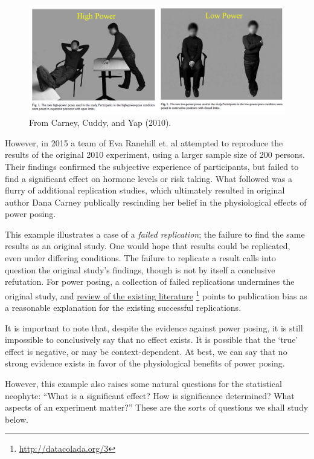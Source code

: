 \documentclass{tufte-handout}
\begin{document}
\begin{figure}[h]
  \includegraphics[width=\linewidth]{./images/2-posing}
  \caption{From Carney, Cuddy, and Yap (2010).}
  \label{fig:2-pose}
\end{figure}

However, in 2015 a team of Eva Ranehill et. al \cite{ranehill2015assessing}
attempted to reproduce the results of the original 2010 experiment, using a
larger sample size of 200 persons. Their findings confirmed the subjective
experience of participants, but failed to find a significant effect on hormone
levels or risk taking. What followed was a flurry of additional replication
studies, which ultimately resulted in original author Dana Carney
\cite{carney2015} publically rescinding her belief in the physiological effects of
power posing.

This example illustrates a case of a \emph{failed replication}; the failure to find
the same results as an original study. One would hope that results could be
replicated, even under differing conditions. The failure to replicate a result
calls into question the original study's findings, though is not by itself a
conclusive refutation. For power posing, a collection of failed replications
undermines the original study, and \href{http://datacolada.org/37}{review of the existing literature}
\footnote{\url{http://datacolada.org/3}} points to publication bias as a reasonable
explanation for the existing successful replications.

It is important to note that, despite the evidence against power posing, it is
still impossible to conclusively say that no effect exists. It is possible that
the `true' effect is negative, or may be context-dependent. At best, we can say
that no strong evidence exists in favor of the physiological benefits of power
posing.

However, this example also raises some natural questions for the statistical
neophyte: ``What is a significant effect? How is significance determined? What
aspects of an experiment matter?'' These are the sorts of questions we shall
study below.
\end{document}
